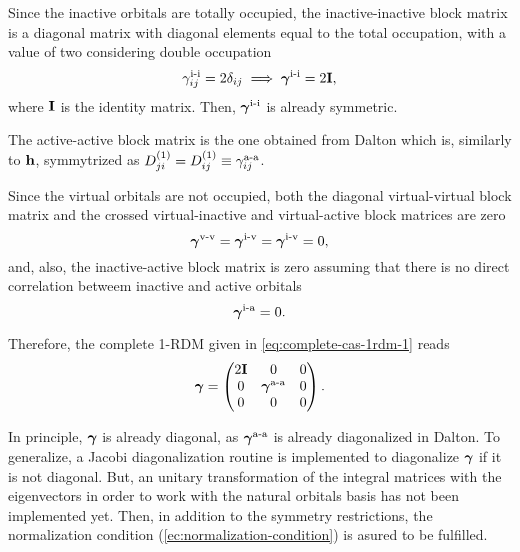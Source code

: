 Since the inactive orbitals are totally occupied, the inactive-inactive block
matrix is a diagonal matrix with diagonal elements equal to the total occupation,
with a value of two considering double occupation
\begin{equation}
         \gamma_{ij}^{\text{i-i}} = 2\delta_{ij}
         \implies
         \boldsymbol{\mathrm{\gamma}}^{\text{i-i}} = 2\boldsymbol{\mathrm{I}}
         ,
\end{equation}
where $ \boldsymbol{\mathrm{I}}$ is the identity matrix.
Then, $ \boldsymbol{\mathrm{\gamma}}^{\text{i-i}}$ is already symmetric.

The active-active block matrix is the one obtained from Dalton which is,
similarly to $\boldsymbol{\mathrm{h}}$, symmytrized as 
$D^{\left( 1 \right)}_{ji} = D^{\left( 1 \right)}_{ij} \equiv \gamma_{ij}^{\text{a-a}}$.

Since the virtual orbitals are not occupied, both the diagonal virtual-virtual
block matrix and the crossed virtual-inactive and virtual-active block
matrices are zero 
\begin{equation}
    \boldsymbol{\mathrm{\gamma}}^{\text{v-v}} =
    \boldsymbol{\mathrm{\gamma}}^{\text{i-v}} =
    \boldsymbol{\mathrm{\gamma}}^{\text{i-v}} = 0
    ,
\end{equation}
and, also, the inactive-active block matrix is zero assuming that there is no
direct correlation betweem inactive and active orbitals 
\begin{equation}
    \boldsymbol{\mathrm{\gamma}}^{\text{i-a}} = 0.
\end{equation}

Therefore, the complete 1-RDM given in \cref{eq:complete-cas-1rdm-1} reads
\begin{equation} \label{eq:complete-cas-1rdm-2}
    \boldsymbol{\mathrm{\gamma}} =
    \begin{pmatrix}
        2\boldsymbol{\mathrm{I}} & 0 & 0 \\
        0 & \boldsymbol{\mathrm{\gamma}}^{\text{a-a}} & 0 \\
        0 & 0 & 0 \\
    \end{pmatrix}
    .
\end{equation}

In principle, $ \boldsymbol{\mathrm{\gamma}}$ is already diagonal, as $ \boldsymbol{\mathrm{\gamma}}^{\text{a-a}}$
is already diagonalized in Dalton.
To generalize, a Jacobi diagonalization routine is implemented to diagonalize
$ \boldsymbol{\mathrm{\gamma}}$ if it is not diagonal. 
But, an unitary transformation of the integral matrices with the eigenvectors
in order to work with the natural orbitals basis has not been implemented yet.
Then, in addition to the symmetry restrictions, the normalization condition
(\cref{ec:normalization-condition}) is asured to be fulfilled.


